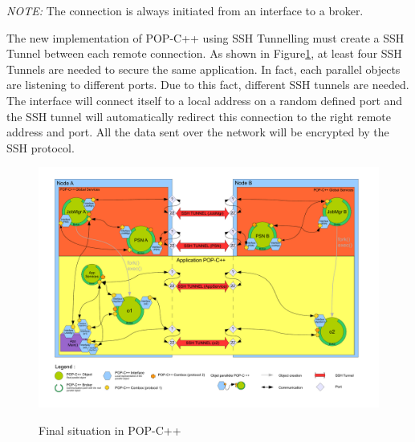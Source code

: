 \textit{NOTE:} The connection is always initiated from an interface to a broker.
\pagebreak



The new implementation of POP-C++ using SSH Tunnelling must create a SSH Tunnel between each remote connection. As shown in Figure\ref{fig:final_sit}, at least four SSH Tunnels are needed to secure the same application. In fact, each parallel objects are listening to different ports. Due to this fact, different SSH tunnels are needed. The interface will connect itself to a local address on a random defined port and the SSH tunnel will automatically redirect this connection to the right remote address and port. All the data sent over the network will be encrypted by the SSH protocol.
\begin{figure}[ht]
	\caption{Final situation in POP-C++}
  	\centering
	\includegraphics[width=1.0\textwidth]{../popc_final_situation.pdf}
	\label{fig:final_sit}
\end{figure}\vspace{2cm}
\pagebreak